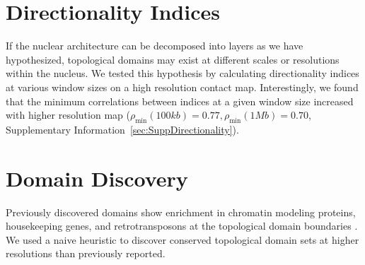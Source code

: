 \section*{Directionality Indices}

If the nuclear architecture can be decomposed into layers as we have hypothesized, topological domains may exist at different
scales or resolutions within the nucleus.  We tested this hypothesis by calculating directionality indices at various window sizes
on a high resolution contact map.  Interestingly, we found that the minimum correlations between indices at a given window size increased
with higher resolution map ($\rho_{\min}(100kb) = 0.77, \rho_{\min}(1Mb) = 0.70$, Supplementary Information~\ref{sec:SuppDirectionality}).

\section*{Domain Discovery}

Previously discovered domains show enrichment in chromatin modeling proteins, housekeeping genes, and retrotransposons at the topological domain
boundaries \citep{dixon2012}.  We used a naive heuristic to discover conserved topological domain sets at higher resolutions than previously reported.

